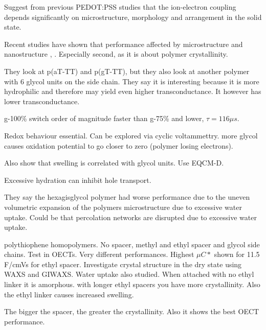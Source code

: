 \documentclass{article}
\begin{document}
Suggest from previous PEDOT:PSS studies that the ion-electron coupling depends significantly on microstructure, morphology and arrangement in the solid state. 

Recent studies have shown that performance affected by microstructure and nanostructure \cite{Savva2020}, \cite{Flagg2019}.  Especially second, as it is about polymer crystallinity.  

They look at p(aT-TT) and p(gT-TT), but they also look at another polymer with 6 glycol units on the side chain.  They say it is interesting because it is more hydrophilic and therefore may yield even higher transconductance.   It however has lower transconductance. 

g-100\% switch order of magnitude faster than g-75\% and lower, $\tau = 116 \mu s$.  

Redox behaviour essential.  Can be explored via cyclic voltammettry. more glycol causes oxidation potential to go closer to zero (polymer losing electrons).  

Also show that swelling is correlated with glycol units.  Use EQCM-D.   

Excessive hydration can inhibit hole transport.  

They say the hexagisglycol polymer had worse performance due to the uneven volumetric expansion of the polymers microstructure due to excessive water uptake. Could be that percolation networks are disrupted due to excessive water uptake.   


 \vspace{1cm}
{\bf \cite{Schmode2020}}

polythiophene homopolymers. No spacer, methyl and ethyl spacer and glycol side chains. Test in OECTs. Very different performances.  Highest $\mu C*$ shown for 11.5 F/cmVs for ethyl spacer. Investigate crystal structure in the dry state using WAXS and GIWAXS.  Water uptake also studied. When attached with no ethyl linker it is amorphous.  with longer ethyl spacers you have more crystallinity. Also the ethyl linker causes increased swelling.  

The bigger the spacer, the greater the crystallinity. Also it shows the best OECT performance. 











\newpage

\footnotesize

  
\end{document}
